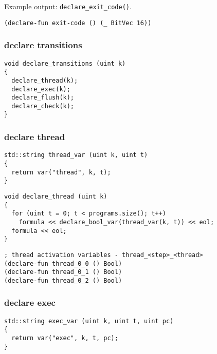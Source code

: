 \noindent
Example output: \lstinline[style=c++]{declare_exit_code()}.

\begin{lstlisting}[language=SMTLib]
(declare-fun exit-code () (_ BitVec 16))
\end{lstlisting}

\subsubsection{declare transitions}

\begin{lstlisting}[style=c++]
void declare_transitions (uint k)
{
  declare_thread(k);
  declare_exec(k);
  declare_flush(k);
  declare_check(k);
}
\end{lstlisting}

\subsubsection{declare thread}

\begin{lstlisting}[style=c++]
std::string thread_var (uint k, uint t)
{
  return var("thread", k, t);
}
\end{lstlisting}

\begin{lstlisting}[style=c++]
void declare_thread (uint k)
{
  for (uint t = 0; t < programs.size(); t++)
    formula << declare_bool_var(thread_var(k, t)) << eol;
  formula << eol;
}
\end{lstlisting}

\begin{lstlisting}[language=SMTLib]
; thread activation variables - thread_<step>_<thread>
(declare-fun thread_0_0 () Bool)
(declare-fun thread_0_1 () Bool)
(declare-fun thread_0_2 () Bool)
\end{lstlisting}

\subsubsection{declare exec}

\begin{lstlisting}[style=c++]
std::string exec_var (uint k, uint t, uint pc)
{
  return var("exec", k, t, pc);
}
\end{lstlisting}

